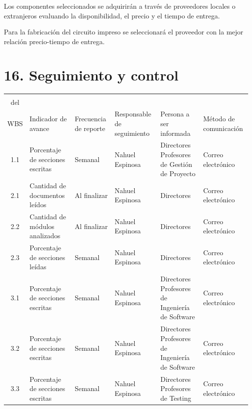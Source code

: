 \documentclass[11pt]{charter}
\begin{document}
Los componentes seleccionados se adquirirán a través de proveedores locales o extranjeros evaluando la disponibilidad, el precio y el tiempo de entrega.

Para la fabricación del circuito impreso se seleccionará el proveedor con la mejor relación precio-tiempo de entrega.

\newpage

\section{16. Seguimiento y control}
\label{sec:seguimiento}

\begin{table}[!htpb]
\centering
\begin{tabularx}{\linewidth}{@{}|c|m{3.5cm}|X|X|X|X|@{}}
\hline
\rowcolor[HTML]{C0C0C0} 
\multicolumn{6}{|c|}{\cellcolor[HTML]{C0C0C0}SEGUIMIENTO DE AVANCE} \\ \hline
\rowcolor[HTML]{C0C0C0} 
\cellcolor[HTML]{C0C0C0}\begin{tabular}[c]{@{}c@{}}Tarea\\del\\WBS\end{tabular} & Indicador de avance & Frecuencia de reporte & Responsable de seguimiento & Persona a ser informada & Método de comunicación \\ \hline
 1.1  & Porcentaje de secciones escritas                   & Semanal      & Nahuel Espinosa & Directores Profesores de Gestión de Proyecto & Correo electrónico \\ \hline
 2.1  & Cantidad de documentos leídos                      & Al finalizar & Nahuel Espinosa & Directores & Correo electrónico \\ \hline
 2.2  & Cantidad de módulos analizados                     & Al finalizar & Nahuel Espinosa & Directores & Correo electrónico \\ \hline
 2.3  & Porcentaje de secciones leídas                     & Semanal      & Nahuel Espinosa & Directores & Correo electrónico \\ \hline
 3.1  & Porcentaje de secciones escritas                   & Semanal      & Nahuel Espinosa & Directores Profesores de Ingeniería de Software & Correo electrónico \\ \hline
 3.2  & Porcentaje de secciones escritas                   & Semanal      & Nahuel Espinosa & Directores Profesores de Ingeniería de Software & Correo electrónico \\ \hline
 3.3  & Porcentaje de secciones escritas                   & Semanal      & Nahuel Espinosa & Directores Profesores de Testing & Correo electrónico \\ \hline

\end{tabularx}
\end{table}
\end{document}
